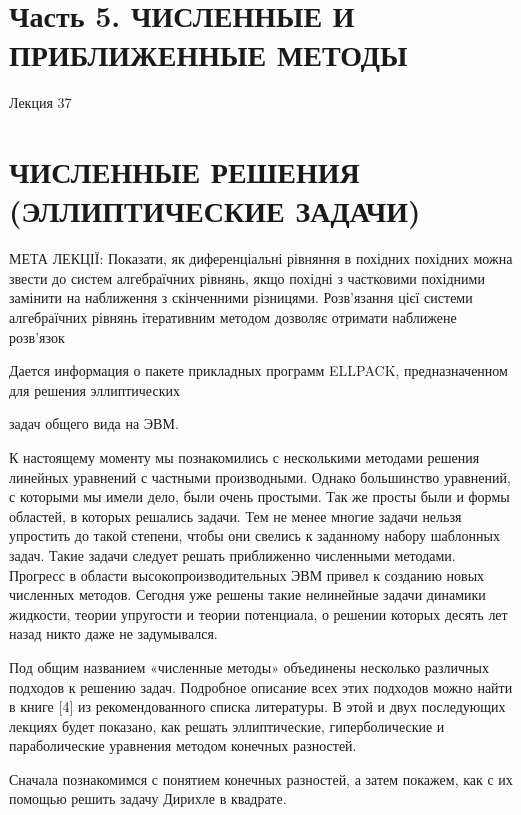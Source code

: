 \documentclass[
  ukrainian,
]{article}
\begin{document}
\section{Часть 5. ЧИСЛЕННЫЕ И ПРИБЛИЖЕННЫЕ
МЕТОДЫ}\label{ux447ux430ux441ux442ux44c-5.-ux447ux438ux441ux43bux435ux43dux43dux44bux435-ux438-ux43fux440ux438ux431ux43bux438ux436ux435ux43dux43dux44bux435-ux43cux435ux442ux43eux434ux44b}

Лекция 37

\section{ЧИСЛЕННЫЕ РЕШЕНИЯ (ЭЛЛИПТИЧЕСКИЕ
ЗАДАЧИ)}\label{ux447ux438ux441ux43bux435ux43dux43dux44bux435-ux440ux435ux448ux435ux43dux438ux44f-ux44dux43bux43bux438ux43fux442ux438ux447ux435ux441ux43aux438ux435-ux437ux430ux434ux430ux447ux438}

МЕТА ЛЕКЦІЇ: Показати, як диференціальні рівняння в похідних похідних
можна звести до систем алгебраїчних рівнянь, якщо похідні з частковими
похідними замінити на наближення з скінченними різницями. Розв'язання
цієї системи алгебраїчних рівнянь ітеративним методом дозволяє отримати
наближене розв'язок

Дается информация о пакете прикладных программ ELLPACK, предназначенном
для решения эллиптических

задач общего вида на ЭВМ.

К настоящему моменту мы познакомились с несколькими методами решения
линейных уравнений с частными производными. Однако большинство
уравнений, с которыми мы имели дело, были очень простыми. Так же просты
были и формы областей, в которых решались задачи. Тем не менее многие
задачи нельзя упростить до такой степени, чтобы они свелись к заданному
набору шаблонных задач. Такие задачи следует решать приближенно
численными методами. Прогресс в области высокопроизводительных ЭВМ
привел к созданию новых численных методов. Сегодня уже решены такие
нелинейные задачи динамики жидкости, теории упругости и теории
потенциала, о решении которых десять лет назад никто даже не
задумывался.

Под общим названием «численные методы» объединены несколько различных
подходов к решению задач. Подробное описание всех этих подходов можно
найти в книге {[}4{]} из рекомендованного списка литературы. В этой и
двух последующих лекциях будет показано, как решать эллиптические,
гиперболические и параболические уравнения методом конечных разностей.

Сначала познакомимся с понятием конечных разностей, а затем покажем, как
с их помощью решить задачу Дирихле в квадрате.
\end{document}
